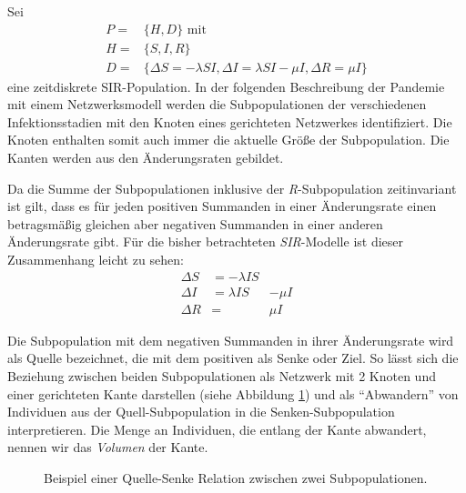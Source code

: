 Sei 
\begin{align}
	P=&\lbrace H, D\rbrace \text{ mit}\label{eq:ssec:multiPop:SIRBegin}\\
	H=&\lbrace S, I, R\rbrace\\
	D=&\lbrace \Delta S= -\lambda SI, \Delta I = \lambda SI - \mu I, \Delta R = \mu I   \rbrace \label{eq:ssec:multiPop:SIREnd}
\end{align}
eine zeitdiskrete SIR-Population. In der folgenden Beschreibung der Pandemie mit einem Netzwerksmodell werden die Subpopulationen der verschiedenen Infektionsstadien mit den Knoten eines gerichteten Netzwerkes identifiziert. Die Knoten enthalten somit auch immer die aktuelle Größe der Subpopulation. Die Kanten werden aus den Änderungsraten gebildet. 

Da die Summe der Subpopulationen inklusive der \emph{R}-Subpopulation zeitinvariant ist gilt, dass es für jeden positiven Summanden in einer Änderungsrate einen betragsmäßig gleichen aber negativen Summanden in einer anderen Änderungsrate gibt. Für die bisher betrachteten \emph{SIR}-Modelle ist dieser Zusammenhang leicht zu sehen:
\begin{align}
	\Delta S & = -\lambda IS & \\
	\Delta I & = \lambda IS & - \mu I \\
	\Delta R & = & \mu I
\end{align}

Die Subpopulation mit dem negativen Summanden in ihrer Änderungsrate wird als Quelle bezeichnet, die mit dem positiven als Senke oder Ziel. So lässt sich die Beziehung zwischen beiden Subpopulationen als Netzwerk mit 2 Knoten und einer gerichteten Kante darstellen (siehe Abbildung \ref{fig:ssec:multiPop:simpleDirectedEdge}) und als ``Abwandern'' von Individuen aus der Quell-Subpopulation in die Senken-Subpopulation interpretieren. Die Menge an Individuen, die entlang der Kante abwandert, nennen wir das \emph{Volumen} der Kante. 

\begin{figure}
\begin{center}\end{center}
\caption{Beispiel einer Quelle-Senke Relation zwischen zwei Subpopulationen.}\label{fig:ssec:multiPop:simpleDirectedEdge}
\end{figure}

